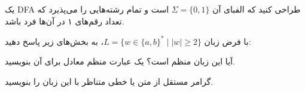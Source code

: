 \documentclass[12pt,largemargins]{quiz}
\begin{document}
\maketitle

\question
یک DFA طراحی کنید که الفبای آن $\Sigma = \{0, 1\}$ است و تمام رشته‌هایی را می‌پذیرد که تعداد رقم‌های ۱ در آن‌ها فرد باشد.

\answerbox{3.5cm}


با فرض زبان $L = \{w \in \{a, b\}^* \mid |w| \ge 2\}$، به بخش‌های زیر پاسخ دهید:

\begin{alphaparts}
  \questionpart آیا این زبان منظم است؟ یک عبارت منظم معادل برای آن بنویسید.
  \answerbox{2.5cm}
  
  \questionpart گرامر مستقل از متن یا خطی متناظر با این زبان را بنویسید.
  \answerbox{2.5cm}
\end{alphaparts}
\end{document}
